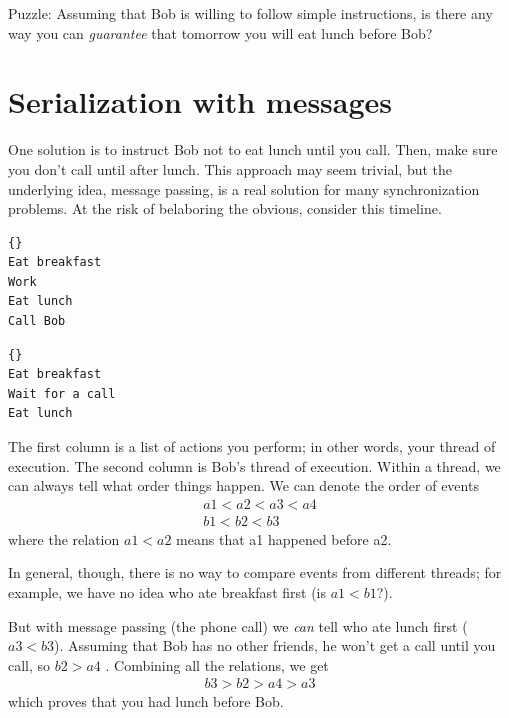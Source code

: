 \documentclass{book}
\begin{document}
Puzzle: Assuming that Bob is willing to follow simple instructions, is
there any way you can {\em guarantee} that tomorrow you will eat lunch
before Bob?


\section {Serialization with messages}
\label{serialization}

One solution is to instruct Bob not to eat lunch until you call.
Then, make sure you don't call until after lunch.  This approach may
seem trivial, but the underlying idea, message passing, is a real
solution for many synchronization problems.
At the risk of belaboring the obvious, consider this timeline.

\begin{minipage}[t]{0.4\textwidth}
    \begin{lstlisting}[title={Thread A (You)}]{}
Eat breakfast 
Work          
Eat lunch     
Call Bob
\end{lstlisting}
\end{minipage}
\hfill
\begin{minipage}[t]{0.4\textwidth}
    \begin{lstlisting}[title={Thread B (Bob)}]{}
Eat breakfast
Wait for a call
Eat lunch
\end{lstlisting}
\end{minipage}

The first column is a list of actions you perform; in other words,
your thread of execution.  The second column is Bob's thread of
execution.  Within a thread, we can always tell what order things
happen.  We can denote the order of events
%
\begin{eqnarray*}
    a1 < a2 < a3 < a4  \\
    b1 < b2 < b3
\end{eqnarray*}
%
where the relation $a1 < a2$ means that a1 happened before a2.

In general, though, there is no way to compare events from different
threads; for example, we have no idea who ate breakfast first (is $a1
    < b1$?).

But with message passing (the phone call) we {\em can} tell who ate
lunch first ($a3 < b3$).  Assuming that Bob has no other friends, he
won't get a call until you call, so $b2 > a4$ .  Combining all the
relations, we get
%
\begin{eqnarray*}
    b3 > b2 > a4 > a3
\end{eqnarray*}
%
which proves that you had lunch before Bob.
\end{document}
